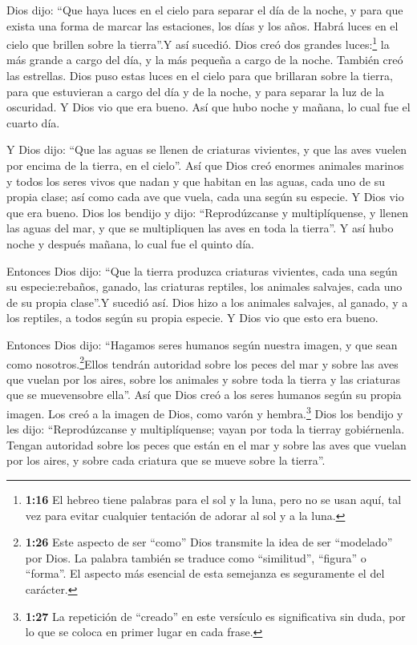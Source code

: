  Dios dijo: ``Que haya luces en el cielo para separar el
día de la noche, y para que exista una forma de marcar las estaciones,
los días y los años.  Habrá luces en el cielo que brillen
sobre la tierra''.Y así sucedió.  Dios creó dos grandes
luces:\footnote{\textbf{1:16} El hebreo tiene palabras para el sol y la
  luna, pero no se usan aquí, tal vez para evitar cualquier tentación de
  adorar al sol y a la luna.} la más grande a cargo del día, y la más
pequeña a cargo de la noche. También creó las estrellas. 
Dios puso estas luces en el cielo para que brillaran sobre la tierra,
 para que estuvieran a cargo del día y de la noche, y para
separar la luz de la oscuridad. Y Dios vio que era bueno. 
Así que hubo noche y mañana, lo cual fue el cuarto día.

 Y Dios dijo: ``Que las aguas se llenen de criaturas
vivientes, y que las aves vuelen por encima de la tierra, en el cielo''.
 Así que Dios creó enormes animales marinos y todos los
seres vivos que nadan y que habitan en las aguas, cada uno de su propia
clase; así como cada ave que vuela, cada una según su especie. Y Dios
vio que era bueno.  Dios los bendijo y dijo:
``Reprodúzcanse y multiplíquense, y llenen las aguas del mar, y que se
multipliquen las aves en toda la tierra''.  Y así hubo
noche y después mañana, lo cual fue el quinto día.

 Entonces Dios dijo: ``Que la tierra produzca criaturas
vivientes, cada una según su especie:rebaños, ganado, las criaturas
reptiles, los animales salvajes, cada uno de su propia clase''.Y sucedió
así.  Dios hizo a los animales salvajes, al ganado, y a los
reptiles, a todos según su propia especie. Y Dios vio que esto era
bueno.

 Entonces Dios dijo: ``Hagamos seres humanos según nuestra
imagen, y que sean como nosotros.\footnote{\textbf{1:26} Este aspecto de
  ser ``como'' Dios transmite la idea de ser ``modelado'' por Dios. La
  palabra también se traduce como ``similitud'', ``figura'' o ``forma''.
  El aspecto más esencial de esta semejanza es seguramente el del
  carácter.}Ellos tendrán autoridad sobre los peces del mar y sobre las
aves que vuelan por los aires, sobre los animales y sobre toda la tierra
y las criaturas que se muevensobre ella''.  Así que Dios
creó a los seres humanos según su propia imagen. Los creó a la imagen de
Dios, como varón y hembra.\footnote{\textbf{1:27} La repetición de
  ``creado'' en este versículo es significativa sin duda, por lo que se
  coloca en primer lugar en cada frase.}  Dios los bendijo
y les dijo: ``Reprodúzcanse y multiplíquense; vayan por toda la tierray
gobiérnenla. Tengan autoridad sobre los peces que están en el mar y
sobre las aves que vuelan por los aires, y sobre cada criatura que se
mueve sobre la tierra''.

